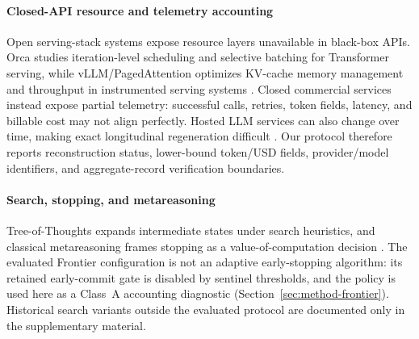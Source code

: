 \paragraph{Closed-API resource and telemetry accounting}
Open serving-stack systems expose resource layers unavailable in black-box APIs. Orca studies
iteration-level scheduling and selective batching for Transformer serving, while vLLM/PagedAttention
optimizes KV-cache memory management and throughput in instrumented serving systems
\citep{orca,vllm_pagedattention}. Closed commercial services instead expose partial telemetry:
successful calls, retries, token fields, latency, and billable cost may not align perfectly. Hosted
LLM services can also change over time, making exact longitudinal regeneration difficult
\citep{chatgpt_drift}. Our protocol therefore reports reconstruction status, lower-bound token/USD
fields, provider/model identifiers, and aggregate-record verification boundaries.

\paragraph{Search, stopping, and metareasoning}
Tree-of-Thoughts expands intermediate states under search heuristics, and classical metareasoning
frames stopping as a value-of-computation decision \citep{tot,metareasoning}. The evaluated
Frontier configuration is not an adaptive early-stopping algorithm: its retained early-commit gate is
disabled by sentinel thresholds, and the policy is used here as a Class~A accounting diagnostic
(Section~\ref{sec:method-frontier}). Historical search variants outside the evaluated protocol are
documented only in the supplementary material.
